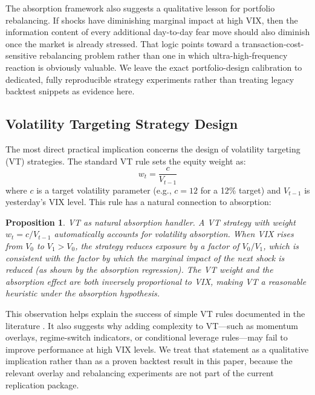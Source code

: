 \documentclass[12pt,a4paper]{article}
\newtheorem{proposition}{Proposition}
\begin{document}
The absorption framework also suggests a qualitative lesson for portfolio rebalancing. If shocks have diminishing marginal impact at high VIX, then the information content of every additional day-to-day fear move should also diminish once the market is already stressed. That logic points toward a transaction-cost-sensitive rebalancing problem rather than one in which ultra-high-frequency reaction is obviously valuable. We leave the exact portfolio-design calibration to dedicated, fully reproducible strategy experiments rather than treating legacy backtest snippets as evidence here.

\subsection{Volatility Targeting Strategy Design}

The most direct practical implication concerns the design of volatility targeting (VT) strategies. The standard VT rule sets the equity weight as:
\begin{equation}
w_t = \frac{c}{V_{t-1}}
\label{eq:vt_weight}
\end{equation}
where $c$ is a target volatility parameter (e.g., $c = 12$ for a 12\% target) and $V_{t-1}$ is yesterday's VIX level. This rule has a natural connection to absorption:

\begin{proposition}
\textit{VT as natural absorption handler.} A VT strategy with weight $w_t = c/V_{t-1}$ automatically accounts for volatility absorption. When VIX rises from $V_0$ to $V_1 > V_0$, the strategy reduces exposure by a factor of $V_0/V_1$, which is consistent with the factor by which the marginal impact of the next shock is reduced (as shown by the absorption regression). The VT weight and the absorption effect are both inversely proportional to VIX, making VT a reasonable heuristic under the absorption hypothesis.
\end{proposition}

This observation helps explain the success of simple VT rules documented in the literature \citep{moreira2017, harvey2018}. It also suggests why adding complexity to VT---such as momentum overlays, regime-switch indicators, or conditional leverage rules---may fail to improve performance at high VIX levels. We treat that statement as a qualitative implication rather than as a proven backtest result in this paper, because the relevant overlay and rebalancing experiments are not part of the current replication package.
\end{document}
